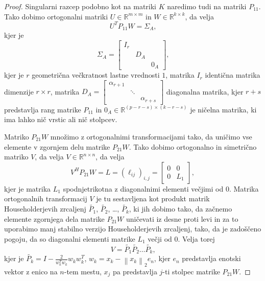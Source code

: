 \documentclass[mat1]{article}
\newcommand{\norm}[1]{\left\lVert#1\right\rVert}
\begin{document}
\begin{proof}
Singularni razcep podobno kot na matriki $K$ naredimo tudi na matriki $P_{11}$. Tako dobimo ortogonalni matriki $U \in \mathbb{R}^{m \times m}$ in $W \in \mathbb{R}^{k \times k}$, da velja $$ U^T P_{11} W = \Sigma_A \text{,}$$ kjer je $$\Sigma_A = 
\begin{bmatrix} 
I_r &  & \\
 & D_A & \\
 & & 0_A  
\end{bmatrix} \text{,}$$ kjer je $r$ geometrična večkratnost lastne vrednosti $1$, matrika $I_r$ identična matrika dimenzije $r \times r$, matrika $D_A =
\begin{bmatrix}
\alpha_{r+1} & & \\
 & \ddots & \\
 & & \alpha_{r+s}
\end{bmatrix}$ diagonalna matrika, kjer $r+s$ predstavlja rang matrike $P_{11}$ in $0_A \in \mathbb{R}^{(p-r-s) \times (k-r-s)}$ je ničelna matrika, ki ima lahko nič vrstic ali nič stolpcev.


Matriko $P_{21} W$ množimo z ortogonalnimi transformacijami tako, da uničimo vse elemente v zgornjem delu matrike $P_{21} W$. Tako dobimo ortogonalno in simetrično matriko $V$, da velja $V \in \mathbb{R}^{n \times n}$, da velja $$ V^H P_{21} W = L = (\ell_{ij})_{i, j} =
\begin{bmatrix} 
0 & 0 \\
0 & L_1
\end{bmatrix} 
,$$
kjer je matrika $L_1$ spodnjetrikotna z diagonalnimi elementi večjimi od $0$. Matrika ortogonalnih transformacij $V$ je tu sestavljena kot produkt matrik Householderjevih zrcaljenj $\tilde{P_1}$, $\tilde{P_2}$, \ldots, $\tilde{P_k}$, ki jih dobimo tako, da začnemo elemente zgornjega dela matrike $P_{21} W$ uničevati iz desne proti levi in za to uporabimo manj stabilno verzijo Householderjevih zrcaljenj, tako, da je zadoščeno pogoju, da so diagonalni elementi matrike $L_1$ večji od $0$.
Velja torej $$V = \tilde{P_1} \tilde{P_2} \dots \tilde{P_k} \text{,}$$
kjer je $\tilde{P_k} = I - \frac{2}{w_k^T w_k} w_k w_k^T$, $w_k = x_k - \norm{x_k}_2 e_n$, kjer $e_n$ predstavlja enotski vektor z enico na $n$-tem mestu, $x_j$ pa predstavlja $j$-ti stolpec matrike $P_{21} W$.



\end{proof}
\end{document}
